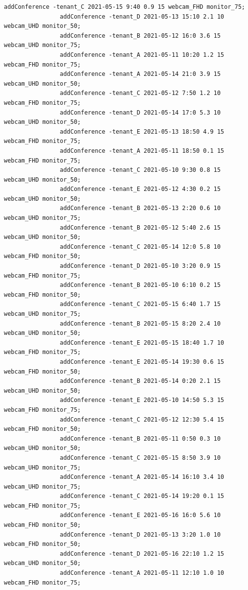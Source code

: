 \documentclass{article}
\begin{document}
\begin{Verbatim}[gobble=8]
                addConference -tenant_C 2021-05-15 9:40 0.9 15 webcam_FHD monitor_75;
                addConference -tenant_D 2021-05-13 15:10 2.1 10 webcam_UHD monitor_50;
                addConference -tenant_B 2021-05-12 16:0 3.6 15 webcam_UHD monitor_75;
                addConference -tenant_A 2021-05-11 10:20 1.2 15 webcam_FHD monitor_75;
                addConference -tenant_A 2021-05-14 21:0 3.9 15 webcam_UHD monitor_50;
                addConference -tenant_C 2021-05-12 7:50 1.2 10 webcam_FHD monitor_75;
                addConference -tenant_D 2021-05-14 17:0 5.3 10 webcam_UHD monitor_50;
                addConference -tenant_E 2021-05-13 18:50 4.9 15 webcam_FHD monitor_75;
                addConference -tenant_A 2021-05-11 18:50 0.1 15 webcam_FHD monitor_75;
                addConference -tenant_C 2021-05-10 9:30 0.8 15 webcam_UHD monitor_50;
                addConference -tenant_E 2021-05-12 4:30 0.2 15 webcam_UHD monitor_50;
                addConference -tenant_B 2021-05-13 2:20 0.6 10 webcam_UHD monitor_75;
                addConference -tenant_B 2021-05-12 5:40 2.6 15 webcam_UHD monitor_50;
                addConference -tenant_C 2021-05-14 12:0 5.8 10 webcam_FHD monitor_50;
                addConference -tenant_D 2021-05-10 3:20 0.9 15 webcam_FHD monitor_75;
                addConference -tenant_B 2021-05-10 6:10 0.2 15 webcam_FHD monitor_50;
                addConference -tenant_C 2021-05-15 6:40 1.7 15 webcam_UHD monitor_75;
                addConference -tenant_B 2021-05-15 8:20 2.4 10 webcam_UHD monitor_50;
                addConference -tenant_E 2021-05-15 18:40 1.7 10 webcam_FHD monitor_75;
                addConference -tenant_E 2021-05-14 19:30 0.6 15 webcam_FHD monitor_50;
                addConference -tenant_B 2021-05-14 0:20 2.1 15 webcam_UHD monitor_50;
                addConference -tenant_E 2021-05-10 14:50 5.3 15 webcam_FHD monitor_75;
                addConference -tenant_C 2021-05-12 12:30 5.4 15 webcam_FHD monitor_50;
                addConference -tenant_B 2021-05-11 0:50 0.3 10 webcam_UHD monitor_50;
                addConference -tenant_C 2021-05-15 8:50 3.9 10 webcam_UHD monitor_75;
                addConference -tenant_A 2021-05-14 16:10 3.4 10 webcam_UHD monitor_75;
                addConference -tenant_C 2021-05-14 19:20 0.1 15 webcam_FHD monitor_75;
                addConference -tenant_E 2021-05-16 16:0 5.6 10 webcam_FHD monitor_50;
                addConference -tenant_D 2021-05-13 3:20 1.0 10 webcam_FHD monitor_50;
                addConference -tenant_D 2021-05-16 22:10 1.2 15 webcam_UHD monitor_50;
                addConference -tenant_A 2021-05-11 12:10 1.0 10 webcam_FHD monitor_75;

\end{Verbatim}
\end{document}
